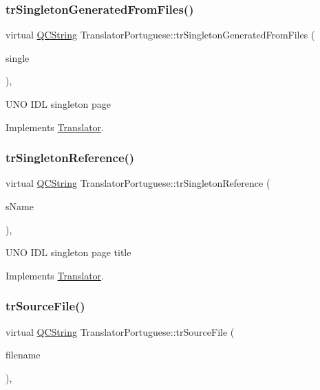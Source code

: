 \subsubsection{\texorpdfstring{trSingletonGeneratedFromFiles()}{trSingletonGeneratedFromFiles()}}
{\footnotesize\ttfamily virtual \mbox{\hyperlink{class_q_c_string}{Q\+C\+String}} Translator\+Portuguese\+::tr\+Singleton\+Generated\+From\+Files (\begin{DoxyParamCaption}\item[{bool}]{single }\end{DoxyParamCaption})\hspace{0.3cm}{\ttfamily [inline]}, {\ttfamily [virtual]}}

U\+NO I\+DL singleton page 

Implements \mbox{\hyperlink{class_translator}{Translator}}.

\mbox{\label{class_translator_portuguese_ae4700e1d3f715c3475489ccaca4c673a}} 
\subsubsection{\texorpdfstring{trSingletonReference()}{trSingletonReference()}}
{\footnotesize\ttfamily virtual \mbox{\hyperlink{class_q_c_string}{Q\+C\+String}} Translator\+Portuguese\+::tr\+Singleton\+Reference (\begin{DoxyParamCaption}\item[{const char $\ast$}]{s\+Name }\end{DoxyParamCaption})\hspace{0.3cm}{\ttfamily [inline]}, {\ttfamily [virtual]}}

U\+NO I\+DL singleton page title 

Implements \mbox{\hyperlink{class_translator}{Translator}}.

\mbox{\label{class_translator_portuguese_a1cba7443861e8b21e334611d217d98fe}} 
\subsubsection{\texorpdfstring{trSourceFile()}{trSourceFile()}}
{\footnotesize\ttfamily virtual \mbox{\hyperlink{class_q_c_string}{Q\+C\+String}} Translator\+Portuguese\+::tr\+Source\+File (\begin{DoxyParamCaption}\item[{\mbox{\hyperlink{class_q_c_string}{Q\+C\+String}} \&}]{filename }\end{DoxyParamCaption})\hspace{0.3cm}{\ttfamily [inline]}, {\ttfamily [virtual]}}

